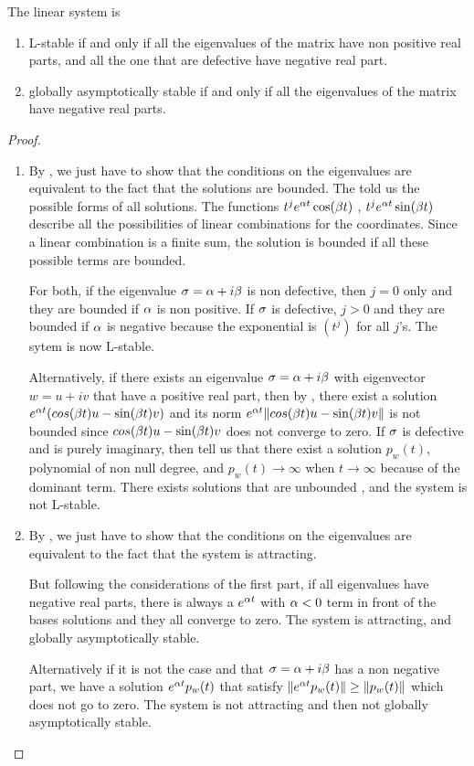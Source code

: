 \begin{theoreme}
    The linear system is 
    \begin{enumerate}
     \item L-stable if and only if all the eigenvalues of the matrix have non positive real parts, and all the one that are defective have negative real part.
    \item globally asymptotically stable if and only if all the eigenvalues of the matrix
    have negative real parts.
    \end{enumerate}
\end{theoreme}
\begin{proof} 
\quad\\
\begin{enumerate}
\item 
By , we just have to show that the conditions on the eigenvalues are equivalent to the fact that the solutions are bounded. The  told us the possible forms of all solutions. The functions $t^je^{\alpha t}\cos(\beta t)$ , $t^je^{\alpha t}\sin(\beta t)$ describe all the possibilities of linear combinations for the coordinates.
Since a linear combination is a finite sum, the solution is bounded if all these possible terms are bounded.

For both, if the eigenvalue $\sigma=\alpha+i\beta$ is non defective, then $j=0$ only and they are bounded if $\alpha$ is non positive. If $\sigma$ is defective, $j>0$ and they are bounded if $\alpha$ is negative because the exponential is $(t^j)$ for all $j$'s. The sytem is now L-stable.

Alternatively, if there exists an eigenvalue $\sigma=\alpha+i\beta$ with eigenvector $w=u+iv$ that have a positive real part, then by , there exist a solution $e^{\alpha t}(cos(\beta t)u-\sin(\beta t)v)$ and its norm $e^{\alpha t}\|cos(\beta t)u-\sin(\beta t)v\|$
is not bounded since $cos(\beta t)u-\sin(\beta t)v$ does not converge to zero. If $\sigma$ is defective and is purely imaginary, then  tell us that there exist a solution $p_w(t)$, polynomial of non null degree, and $p_w(t)\to\infty$ when $t\to\infty$ because of the dominant term. There exists solutions that are unbounded , and the system is not L-stable.

\item 
By , we just have to show that the conditions on the eigenvalues are equivalent to the fact that the system is attracting.

But following the considerations of the first part, if all eigenvalues have negative real parts, there is always a $e^{\alpha t}$ with $\alpha<0$ term in front of the bases solutions and they all converge to zero. The system is attracting, and globally asymptotically stable.

Alternatively if it is not the case and that $\sigma=\alpha+i\beta$ has a non negative part, we have a solution $e^{\alpha t}p_w(t)$ that satisfy $\|e^{\alpha t}p_w(t)\| \geq \|p_w(t)\|$ which does not go to zero. The system is not attracting and then not globally asymptotically stable.
\end{enumerate}
\end{proof}
